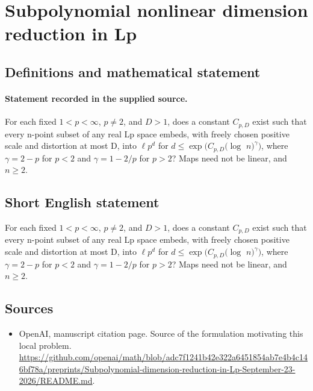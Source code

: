 \documentclass[11pt]{article}
\begin{document}
\section*{Subpolynomial nonlinear dimension reduction in Lp}\label{statement}
\subsection{Definitions and mathematical statement}
\paragraph{Statement recorded in the supplied source.}
For each fixed $1<p<\infty $, $p\neq 2$, and $D>1$, does a constant $C_{p,D}$ exist such that every n-point subset of any real Lp space embeds, with freely chosen positive scale and distortion at most D, into $\ell p^d$ for $d\leq \exp (C_{p,D}(\log $ $n)^\gamma )$, where $\gamma =2-p$ for $p<2$ and $\gamma =1-2/p$ for $p>2$? Maps need not be linear, and $n\geq 2$.
\subsection{Short English statement}
For each fixed $1<p<\infty $, $p\neq 2$, and $D>1$, does a constant $C_{p,D}$ exist such that every n-point subset of any real Lp space embeds, with freely chosen positive scale and distortion at most D, into $\ell p^d$ for $d\leq \exp (C_{p,D}(\log $ $n)^\gamma )$, where $\gamma =2-p$ for $p<2$ and $\gamma =1-2/p$ for $p>2$? Maps need not be linear, and $n\geq 2$.
\subsection{Sources}
\begin{itemize}
\item[S1] OpenAI, manuscript citation page. Source of the formulation motivating this local problem.
\url{https://github.com/openai/math/blob/adc7f1241b42e322a6451854ab7e4b4c146bf78a/preprints/Subpolynomial-dimension-reduction-in-Lp-September-23-2026/README.md}.
\end{itemize}
\end{document}
